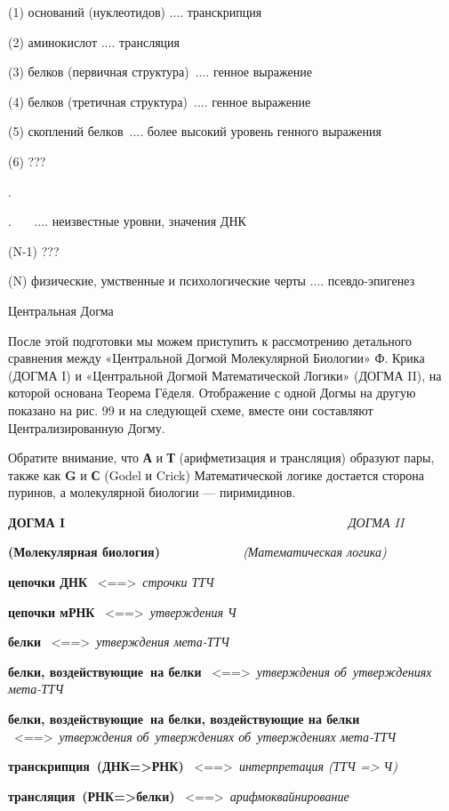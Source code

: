 (1) оснований (нуклеотидов) .... транскрипция

(2) аминокислот .... трансляция

(3) белков (первичная структура)~.... генное выражение

(4) белков (третичная структура)~.... генное выражение

(5) скоплений белков~.... более высокий уровень генного выражения

(6) ???

.

.~~~ .... неизвестные уровни, значения ДНК

(N-1) ???

(N) физические, умственные и психологические черты .... псевдо-эпигенез

Центральная Догма

После этой подготовки мы можем приступить к рассмотрению детального сравнения между «Центральной Догмой Молекулярной Биологии» Ф. Крика (ДОГМА I) и «Центральной Догмой Математической Логики» (ДОГМА II), на которой основана Теорема Гёделя. Отображение с одной Догмы на другую показано на рис. 99 и на следующей схеме, вместе они составляют Централизированную Догму.

Обратите внимание, что \textbf{А} и \textbf{Т} (арифметизация и трансляция) образуют пары, также как \textbf{G} и \textbf{С} (Godel и Crick) Математической логике достается сторона пуринов, а молекулярной биологии --- пиримидинов.

\textbf{ДОГМА I~~~~~~~~~~~~~~~~~~~~~~~~~~~~~~~~~~~~~~~} \emph{ДОГМА II}

\textbf{(Молекулярная биология)~~~~~~~~~~~} \emph{(Математическая логика)}

\textbf{цепочки ДНК} ~\textless==\textgreater~\emph{строчки ТТЧ}

\textbf{цепочки мРНК} ~\textless==\textgreater~\emph{утверждения Ч}

\textbf{белки} ~\textless==\textgreater~\emph{утверждения мета-ТТЧ}

\textbf{белки, воздействующие~на белки} ~\textless==\textgreater~\emph{утверждения об~утверждениях мета-ТТЧ}

\textbf{белки, воздействующие~на белки, воздействующие на белки} ~\textless==\textgreater~\emph{утверждения об~утверждениях об~утверждениях мета-ТТЧ}

\textbf{транскрипция~(ДНК=\textgreater РНК)} ~\textless==\textgreater~\emph{интерпретация (ТТЧ =\textgreater{} Ч)}

\textbf{трансляция~(РНК=\textgreater белки)} ~\textless==\textgreater~\emph{арифмоквайнирование}

